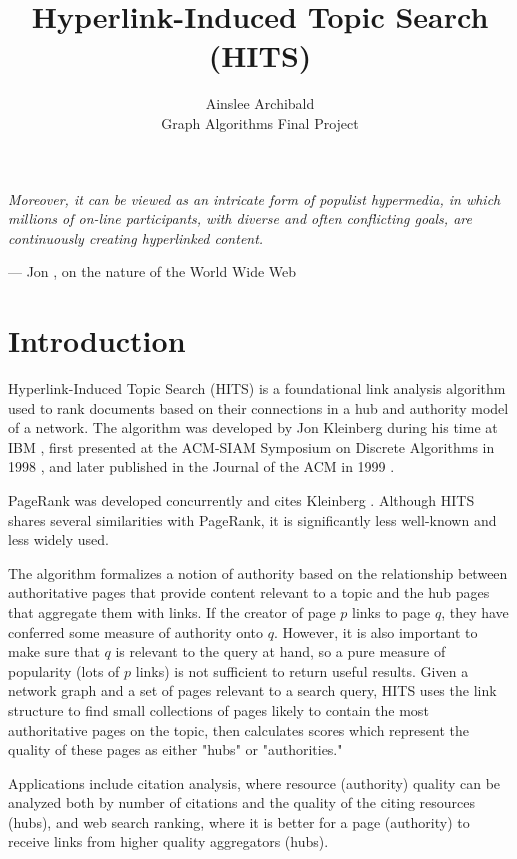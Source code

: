 \documentclass[11pt]{article}
\title{Hyperlink-Induced Topic Search (HITS)}
\author{Ainslee Archibald \\ Graph Algorithms Final Project}
\date{}
\begin{document}
\maketitle

\epigraph{%
\textit{Moreover, it can be viewed as an intricate form of populist hypermedia, in which millions of on-line participants, with diverse and often conflicting goals, are continuously creating hyperlinked content.}%
}{--- Jon \textcite{kleinberg_authoritative_1999}, on the nature of the World Wide Web}

\section{Introduction}
Hyperlink-Induced Topic Search (HITS) is a foundational link analysis algorithm used to rank documents based on their connections in a hub and authority model of a network.
The algorithm was developed by Jon Kleinberg during his time at IBM \parencite{kleinberg_method_2000}, first presented at the ACM-SIAM Symposium on Discrete Algorithms in 1998 \parencite{kleinberg_authoritative_1998}, and later published in the Journal of the ACM in 1999 \parencite{kleinberg_authoritative_1999}.

PageRank was developed concurrently and cites Kleinberg \parencite{brin_anatomy_1998}.
Although HITS shares several similarities with PageRank, it is significantly less well-known and less widely used.

The algorithm formalizes a notion of authority based on the relationship between authoritative pages that provide content relevant to a topic and the hub pages that aggregate them with links.
If the creator of page $p$ links to page $q$, they have conferred some measure of authority onto $q$.
However, it is also important to make sure that $q$ is relevant to the query at hand, so a pure measure of popularity (lots of $p$ links) is not sufficient to return useful results.
Given a network graph and a set of pages relevant to a search query, HITS uses the link structure to find small collections of pages likely to contain the most authoritative pages on the topic, then calculates scores which represent the quality of these pages as either "hubs" or "authorities."

Applications include citation analysis, where resource (authority) quality can be analyzed both by number of citations and the quality of the citing resources (hubs), and web search ranking, where it is better for a page (authority) to receive links from higher quality aggregators (hubs).
\end{document}
